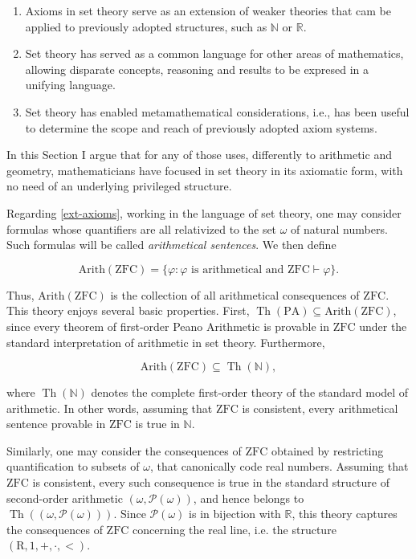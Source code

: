 \documentclass[11pt,a4paper]{article}
\begin{document}
\begin{enumerate}

\item \label{ext-axioms} Axioms in set theory serve as an extension of weaker theories that cam be applied to previously adopted structures, such as $\mathbb{N}$ or $\mathbb{R}$.

\item \label{common-language} Set theory has served as a common language for other areas of mathematics, allowing disparate concepts, reasoning and results to be expresed in a unifying language.

\item \label{metamathematics} Set theory has enabled metamathematical considerations, i.e., has been useful to determine the scope and reach of previously adopted axiom systems.

\end{enumerate}

In this Section I argue that for any of those uses, differently to arithmetic and geometry, mathematicians have focused in set theory in its axiomatic form, with no need of an underlying privileged structure.

Regarding \ref{ext-axioms}, working in the language of set theory, one may consider formulas whose quantifiers are all relativized to the set $\omega$ of natural numbers. Such formulas will be called \emph{arithmetical sentences}. We then define

$$ \mathrm{Arith}(\mathrm{ZFC}) = \{\varphi : \varphi \text{ is arithmetical and } \mathrm{ZFC}\vdash\varphi\}.$$

Thus, $\mathrm{Arith}(\mathrm{ZFC})$ is the collection of all arithmetical consequences of $\mathrm{ZFC}$. This theory enjoys several basic properties. First, $\operatorname{Th}(\mathrm{PA}) \subseteq \mathrm{Arith}(\mathrm{ZFC})$, since every theorem of first-order Peano Arithmetic is provable in $\mathrm{ZFC}$ under the standard interpretation of arithmetic in set theory. Furthermore,

$$ \mathrm{Arith}(\mathrm{ZFC}) \subseteq \operatorname{Th}(\mathbb{N}), $$

where $\operatorname{Th}(\mathbb{N})$ denotes the complete first-order theory of the standard model of arithmetic. In other words, assuming that $\mathrm{ZFC}$ is consistent, every arithmetical sentence provable in $\mathrm{ZFC}$ is true in $\mathbb{N}$.

Similarly, one may consider the consequences of $\mathrm{ZFC}$ obtained by restricting quantification to subsets of $\omega$, that canonically code real numbers. Assuming that $\mathrm{ZFC}$ is consistent, every such consequence is true in the standard structure of second-order arithmetic $(\omega, \mathcal{P}(\omega))$, and hence belongs to $\operatorname{Th}((\omega, \mathcal{P}(\omega)))$. Since $\mathcal{P}(\omega)$ is in bijection with $\mathbb{R}$, this theory captures the consequences of $\mathrm{ZFC}$ concerning the real line, i.e. the structure $(\mathrm{R}, 1, +, \cdot, <)$.
\end{document}
